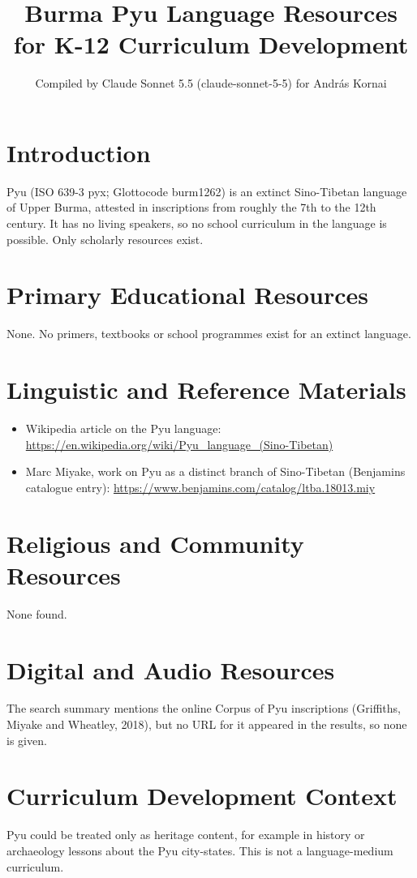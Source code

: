 \documentclass[12pt]{article}
\title{Burma Pyu Language Resources for K-12 Curriculum Development}
\author{Compiled by Claude Sonnet 5.5 (claude-sonnet-5-5) for Andr\'as Kornai}
\date{}
\begin{document}
\maketitle

\section{Introduction}
Pyu (ISO 639-3 pyx; Glottocode burm1262) is an extinct Sino-Tibetan language of Upper Burma, attested in inscriptions from roughly the 7th to the 12th century. It has no living speakers, so no school curriculum in the language is possible. Only scholarly resources exist.

\section{Primary Educational Resources}
None. No primers, textbooks or school programmes exist for an extinct language.

\section{Linguistic and Reference Materials}
\begin{itemize}
\item Wikipedia article on the Pyu language: \url{https://en.wikipedia.org/wiki/Pyu_language_(Sino-Tibetan)}
\item Marc Miyake, work on Pyu as a distinct branch of Sino-Tibetan (Benjamins catalogue entry): \url{https://www.benjamins.com/catalog/ltba.18013.miy}
\end{itemize}

\section{Religious and Community Resources}
None found.

\section{Digital and Audio Resources}
The search summary mentions the online Corpus of Pyu inscriptions (Griffiths, Miyake and Wheatley, 2018), but no URL for it appeared in the results, so none is given.

\section{Curriculum Development Context}
Pyu could be treated only as heritage content, for example in history or archaeology lessons about the Pyu city-states. This is not a language-medium curriculum.
\end{document}
